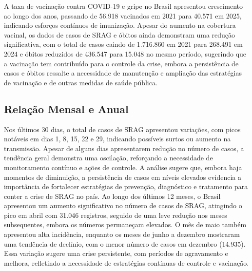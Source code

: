 \documentclass{article}%
\begin{document}
%
A taxa de vacinação contra COVID{-}19 e gripe no Brasil apresentou crescimento ao longo dos anos, passando de 56.918 vacinados em 2021 para 40.571 em 2025, indicando esforços contínuos de imunização. Apesar do aumento na cobertura vacinal, os dados de casos de SRAG e óbitos ainda demonstram uma redução significativa, com o total de casos caindo de 1.716.860 em 2021 para 268.491 em 2024 e óbitos reduzidos de 436.547 para 15.048 no mesmo período, sugerindo que a vacinação tem contribuído para o controle da crise, embora a persistência de casos e óbitos ressalte a necessidade de manutenção e ampliação das estratégias de vacinação e de outras medidas de saúde pública.\newline%

%
\subsection{Relação Mensal e Anual}%
\label{subsec:RelaoMensaleAnual}%
Nos últimos 30 dias, o total de casos de SRAG apresentou variações, com picos notáveis em dias 1, 8, 15, 22 e 29, indicando possíveis surtos ou aumento na transmissão. Apesar de alguns dias apresentarem redução no número de casos, a tendência geral demonstra uma oscilação, reforçando a necessidade de monitoramento contínuo e ações de controle. A análise sugere que, embora haja momentos de diminuição, a persistência de casos em níveis elevados evidencia a importância de fortalecer estratégias de prevenção, diagnóstico e tratamento para conter a crise de SRAG no país.\newline%
%
Ao longo dos últimos 12 meses, o Brasil apresentou um aumento significativo no número de casos de SRAG, atingindo o pico em abril com 31.046 registros, seguido de uma leve redução nos meses subsequentes, embora os números permaneçam elevados. O mês de maio também apresentou alta incidência, enquanto os meses de junho a dezembro mostraram uma tendência de declínio, com o menor número de casos em dezembro (14.935). Essa variação sugere uma crise persistente, com períodos de agravamento e melhora, refletindo a necessidade de estratégias contínuas de controle e vacinação.\newline%
%
\end{document}
